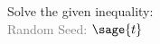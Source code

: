 \documentclass{article}%
\begin{document}

\noindent Solve the given inequality: \\
\textcolor{gray}{Random Seed: $\sage{t}$}


\begin{multicols}{3}
\begin{enumerate}
\end{enumerate}
\end{multicols}


\vfill
\newpage


\begin{multicols}{3}
\begin{enumerate}
\end{enumerate}
\end{multicols}
\end{document}
